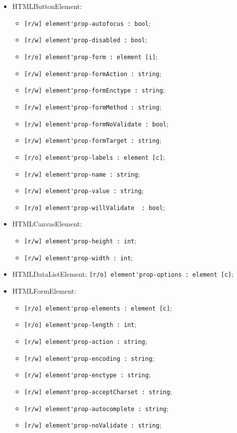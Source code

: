 \documentclass[a4paper, 14pt]{extarticle}
\newenvironment{icItems}
	{ \begin{itemize} [noitemsep,nolistsep] }
	{ \end{itemize} }
\begin{document}
\begin{icItems}
	\item HTMLButtonElement:
	\begin{icItems}
		\item \lstinline|[r/w] element'prop-autofocus : bool|;
		\item \lstinline|[r/w] element'prop-disabled : bool|;
		\item \lstinline|[r/o] element'prop-form : element [i]|;
		\item \lstinline|[r/w] element'prop-formAction : string|;
		\item \lstinline|[r/w] element'prop-formEnctype : string|;
		\item \lstinline|[r/w] element'prop-formMethod : string|;
		\item \lstinline|[r/w] element'prop-formNoValidate : bool|;
		\item \lstinline|[r/w] element'prop-formTarget : string|;
		\item \lstinline|[r/o] element'prop-labels : element [c]|;
		\item \lstinline|[r/w] element'prop-name : string|;
		\item \lstinline|[r/w] element'prop-value : string|;
		\item \lstinline|[r/o] element'prop-willValidate  : bool|;
	\end{icItems}
	
	\item HTMLCanvasElement:
	\begin{icItems}
		\item \lstinline|[r/w] element'prop-height : int|;
		\item \lstinline|[r/w] element'prop-width : int|;
	\end{icItems}
	
	\item HTMLDataListElement: \lstinline|[r/o] element'prop-options : element [c]|;
	
	\item HTMLFormElement:
	\begin{icItems}
		\item \lstinline|[r/o] element'prop-elements : element [c]|;
		\item \lstinline|[r/o] element'prop-length : int|;
		\item \lstinline|[r/w] element'prop-action : string|;
		\item \lstinline|[r/w] element'prop-encoding : string|;
		\item \lstinline|[r/w] element'prop-enctype : string|;
		\item \lstinline|[r/w] element'prop-acceptCharset : string|;
		\item \lstinline|[r/w] element'prop-autocomplete : string|;
		\item \lstinline|[r/w] element'prop-noValidate : string|;
	\end{icItems}
	

\end{icItems}
\end{document}
